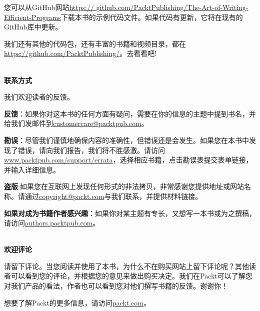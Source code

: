 您可以从GitHub网站\url{https://	github.com/PacktPublishing/The-Art-of-Writing-Efficient-Programs}下载本书的示例代码文件。如果代码有更新，它将在现有的GitHub库中更新。

我们还有其他的代码包，还有丰富的书籍和视频目录，都在\url{https://github.com/PacktPublishing/}。去看看吧!

\hspace*{\fill} \\ %
\textbf{联系方式}

我们欢迎读者的反馈。

\textbf{反馈}：如果你对这本书的任何方面有疑问，需要在你的信息的主题中提到书名，并给我们发邮件到\url{customercare@packtpub.com}。

\textbf{勘误}：尽管我们谨慎地确保内容的准确性，但错误还是会发生。如果您在本书中发现了错误，请向我们报告，我们将不胜感激。请访问\url{www.packtpub.com/support/errata}，选择相应书籍，点击勘误表提交表单链接，并输入详细信息。

\textbf{盗版}:如果您在互联网上发现任何形式的非法拷贝，非常感谢您提供地址或网站名称。请通过\url{copyright@packt.com}与我们联系，并提供材料链接。

\textbf{如果对成为书籍作者感兴趣}：如果你对某主题有专长，又想写一本书或为之撰稿，请访问\url{authors.packtpub.com}。

\hspace*{\fill} \\ %
\textbf{欢迎评论}

请留下评论。当您阅读并使用了本书，为什么不在购买网站上留下评论呢？其他读者可以看到您的评论，并根据您的意见来做出购买决定。我们在Packt可以了解您对我们产品的看法，作者也可以看到您对他们撰写书籍的反馈。谢谢你！

想要了解Packt的更多信息，请访问\url{packt.com}。











